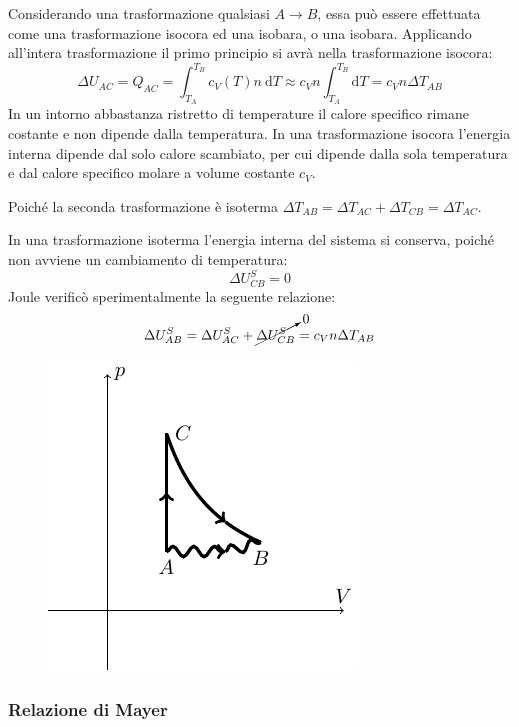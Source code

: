 \documentclass{article}
\newcommand{\df}{\mathrm{d}}
\numberwithin{equation}{subsection}
\begin{document}
Considerando una trasformazione qualsiasi $A\to B$, essa può essere 
effettuata come una trasformazione isocora ed una isobara, 
o una isobara. Applicando all'intera trasformazione il primo 
principio si avrà nella trasformazione isocora:
\begin{equation*}
    \Delta U_{AC}=Q_{AC}=\int_{T_A}^{T_B}c_V(T)n\:\df T\approx c_Vn\int_{T_A}^{T_B}\df T=c_Vn\Delta T_{AB}
\end{equation*}
In un intorno abbastanza ristretto di temperature il calore specifico rimane costante e non dipende dalla temperatura. In una trasformazione isocora l'energia interna 
dipende dal solo calore scambiato, per cui dipende dalla sola temperatura e dal calore specifico molare a volume costante $c_V$. 


Poiché la seconda trasformazione 
è isoterma $\Delta T_{AB}=\Delta T_{AC}+\Delta T_{CB}=\Delta T_{AC}$. 



In una trasformazione isoterma l'energia interna del sistema 
si conserva, poiché non avviene un cambiamento di temperatura: 
\begin{equation*}
    \Delta U_{CB}^S=0
\end{equation*}
Joule verificò sperimentalmente la seguente relazione: 
\begin{equation}
    \Delta U^S_{AB}=\Delta U^S_{AC}+\cancelto{0}{\Delta U^S_{CB}}=c_Vn\Delta T_{AB}
\end{equation}

\begin{figure}[H]%
    \centering
    \includegraphics{calorimetria.pdf}%
\end{figure}

\subsubsection{Relazione di Mayer}
\end{document}
